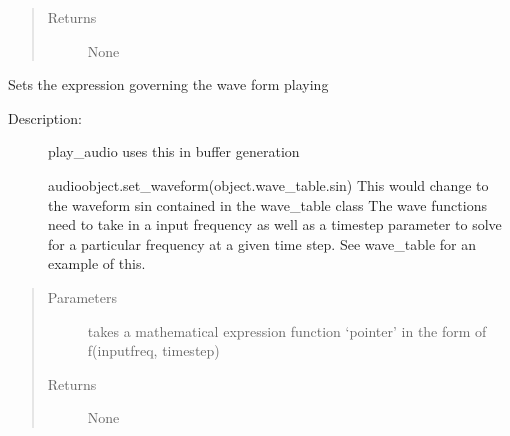 \documentclass[letterpaper,10pt,english,openany,oneside]{sphinxmanual}
\begin{document}
\begin{fulllineitems}
\begin{fulllineitems}
\begin{quote}
\begin{description}
\item[{Returns}] \leavevmode
\sphinxAtStartPar
None

\end{description}\end{quote}

\end{fulllineitems}


\begin{fulllineitems}
\label{\detokenize{dpav:dpav.audio.Audio.set_waveform}}
\sphinxAtStartPar
Sets the expression governing the wave form playing
\begin{description}
\item[{Description:}] \leavevmode
\sphinxAtStartPar
play\_audio uses this in buffer generation

\sphinxAtStartPar
audioobject.set\_waveform(object.wave\_table.sin)
This would change to the waveform sin contained in the wave\_table class
The wave functions need to take in a input frequency as well as a timestep parameter
to solve for a particular frequency at a given time step. See wave\_table for an example of this.

\end{description}
\begin{quote}\begin{description}
\item[{Parameters}] \leavevmode
\sphinxAtStartPar
{} \textendash{} takes a mathematical expression function ‘pointer’ in the form of f(inputfreq, timestep)

\item[{Returns}] \leavevmode
\sphinxAtStartPar
None

\end{description}\end{quote}

\end{fulllineitems}



\end{fulllineitems}
\end{document}
